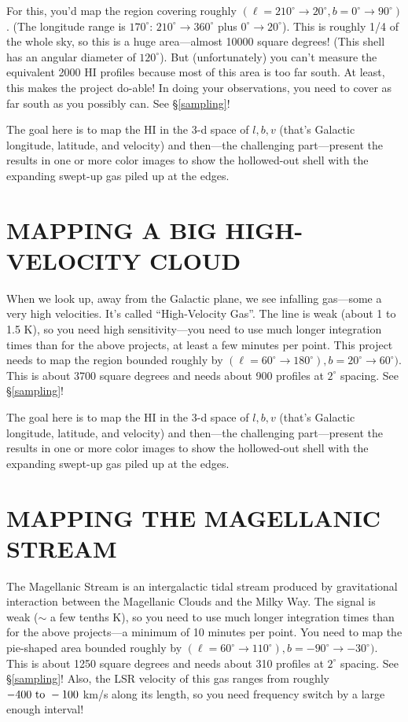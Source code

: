 \documentclass[preprint]{aastex}
\begin{document}
For this, you'd map the region covering roughly $(\ell=210^\circ
\rightarrow 20^\circ, b=0^\circ \rightarrow 90^\circ)$. (The longitude
range is $170^\circ$: $210^\circ \rightarrow 360^\circ$ plus $0^\circ
\rightarrow 20^\circ$). This is roughly 1/4 of the whole sky, so this is
a huge area---almost 10000 square degrees! (This shell has an angular
diameter of $120^\circ$). But (unfortunately) you can't measure the
equivalent 2000 HI profiles because most of this area is too far
south. At least, this makes the project do-able! In doing your
observations, you need to cover as far south as you possibly can. See
\S \ref{sampling}!

The goal here is to map the HI in the 3-d space of ${l, b, v}$ (that's
Galactic longitude, latitude, and velocity) and then---the challenging
part---present the results in one or more color images to show the
hollowed-out shell with the expanding swept-up gas piled up at the
edges.

\section{MAPPING A BIG HIGH-VELOCITY CLOUD}

When we look up, away from the Galactic plane, we see infalling
gas---some a very high velocities. It's called ``High-Velocity Gas''.
The line is weak (about 1 to 1.5 K), so you need high sensitivity---you
need to use much longer integration times than for the above projects,
at least a few minutes per point.  This project needs to map the region
bounded roughly by $(\ell=60^\circ \rightarrow 180^\circ), b=20^\circ
\rightarrow 60^\circ)$. This is about 3700 square degrees and needs
about 900 profiles at $2^\circ$ spacing. See
\S \ref{sampling}!

The goal here is to map the HI in the 3-d space of ${l, b, v}$ (that's
Galactic longitude, latitude, and velocity) and then---the challenging
part---present the results in one or more color images to show the
hollowed-out shell with the expanding swept-up gas piled up at the
edges.

\section{MAPPING THE MAGELLANIC STREAM}

The Magellanic Stream is an intergalactic tidal stream produced by
gravitational interaction between the Magellanic Clouds and the Milky
Way. The signal is weak ($\sim$ a few tenths K), so you need to use much
longer integration times than for the above projects---a minimum of 10
minutes per point. You need to map the pie-shaped area bounded roughly
by $(\ell=60^\circ \rightarrow 110^\circ), b=-90^\circ \rightarrow
-30^\circ)$. This is about 1250 square degrees and needs about 310
profiles at $2^\circ$ spacing. See \S \ref{sampling}!  Also, the LSR
velocity of this gas ranges from roughly $-400 \ {\rm to} \ -100$ km/s
along its length, so you need frequency switch by a large enough
interval!
\end{document}
